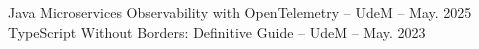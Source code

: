 Java Microservices Observability with OpenTelemetry -- UdeM -- May. 2025\\
TypeScript Without Borders: Definitive Guide -- UdeM -- May. 2023
